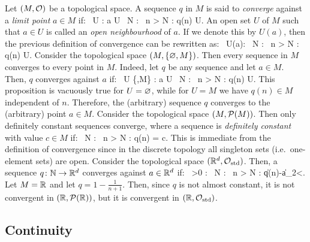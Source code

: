 \bd
Let $(M,\mathcal{O})$ be a topological space. A sequence $q$ in $M$ is said to \emph{converge} against a \emph{limit point} $a\in M$ if:
\bse
\forall \, U \in \cO : a \in U \imp \exists \, N \in \N : \forall \, n > N : q(n) \in U.
\ese
\ed
\br
An open set $U$ of $M$ such that $a\in U$ is called an \emph{open neighbourhood} of $a$. If we denote this by $U(a)$, then the previous definition of convergence can be rewritten as:
\bse
\forall \, U(a): \exists \, N \in \N : \forall \, n > N : q(n) \in U.
\ese
\er
\be
Consider the topological space $(M,\{\varnothing,M\})$. Then every sequence in $M$ converges to every point in $M$. Indeed, let $q$ be any sequence and let $a \in M$. Then, $q$ converges against $a$ if:
\bse
\forall \, U \in \{\vn,M\} : a \in U \imp \exists \, N \in \N : \forall \, n > N : q(n) \in U.
\ese
This proposition is vacuously true for $U=\varnothing$, while for $U=M$ we have $q(n)\in M$ independent of $n$. Therefore, the (arbitrary) sequence $q$ converges to the (arbitrary) point $a\in M$. 
\ee
\be
Consider the topological space $(M,\mathcal{P}(M))$. Then only definitely constant sequences converge, where a sequence is \emph{definitely constant} with value $c\in M$ if:
\bse
\exists \, N \in \N : \forall \, n > N : q(n) = c.
\ese
This is immediate from the definition of convergence since in the discrete topology all singleton sets (i.e.\ one-element sets) are open. 
\ee
\be
Consider the topological space $(\mathbb{R}^d,\mathcal{O}_\mathrm{std})$. Then, a sequence $q\colon \mathbb{N} \to \mathbb{R}^d$ converges against $a\in \mathbb{R}^d$ if:
\bse
\forall\, \ve >0 : \exists \, N \in \N : \forall \, n > N : \|q(n)-a\|_2<\ve.
\ese
\ee
\be
Let $M=\mathbb{R}$ and let $q=1-\frac{1}{n+1}$. Then, since $q$ is not almost constant, it is not convergent in $(\mathbb{R},\mathcal{P}(\mathbb{R}))$, but it is convergent in $(\mathbb{R},\mathcal{O}_\mathrm{std})$.
\ee

\subsection{Continuity}

